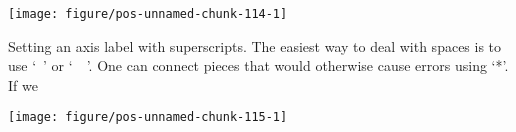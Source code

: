 \documentclass[paper=a4,headsepline,BCOR=12mm,twoside,open=right,%
titlepage,headings=small,fontsize=10pt,index=totoc,bibliography=totoc,%
captions=tableheading,captions=nooneline]{scrbook}\usepackage{knitr}
\begin{document}
\begin{knitrout}\footnotesize
{}\color{fgcolor}\begin{kframe}
\begin{alltt}
 \hlkwb{<-}
  \hlstd{(} \hlstd{=} \hlopt{:}\hlstd{,}  \hlstd{=} \hlstd{(}\hlstd{,} \hlstd{),}
              \hlstd{=} \hlstd{(}\hlstr{"alpha["}\hlstd{,} \hlopt{:}\hlstd{,} \hlstr{"]"}\hlstd{,}  \hlstd{=} \hlstd{))}
\hlopt{$} \hlkwb{<-} \hlstd{(}\hlstr{"alpha["}\hlopt{$} \hlstr{"]"}\hlstd{,} \hlstd{=}\hlstd{)}
 \hlkwb{<-}   \hlopt{+}
   \hlstd{(}\hlstd{=}\hlstd{,} \hlstd{=}\hlstd{,} \hlstd{=}\hlstd{)} \hlopt{+} \hlstd{())}
\end{alltt}
\end{kframe}

{\centering \texttt{[image: figure/pos-unnamed-chunk-114-1]} 

}



\end{knitrout}

Setting an axis label with superscripts. The easiest way to deal with spaces is to use `~' or `~~'. One can connect pieces that would otherwise cause errors using `*'. If we

\begin{knitrout}\footnotesize
{}\color{fgcolor}\begin{kframe}
\begin{alltt}
 \hlopt{+} \hlstd{(}\hlstd{=} \hlstd{=}\hlopt{~~}\hlopt{~}\hlopt{^}\hlstd{\{}\hlopt{-}\hlstd{\})))}
\end{alltt}
\end{kframe}

{\centering \texttt{[image: figure/pos-unnamed-chunk-115-1]} 

}



\end{knitrout}
\end{document}
